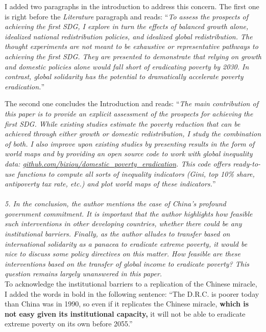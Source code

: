 \documentclass[12pt,english]{article}
\begin{document}
I added two paragraphs in the introduction to address this concern. The first one is right before the \textit{Literature} paragraph and reads: ``\textit{To assess the prospects of achieving the first SDG, I explore in turn the effects of balanced growth alone, idealized national redistribution policies, and idealized global redistribution. The thought experiments are not meant to be exhaustive or representative pathways to achieving the first SDG. They are presented to demonstrate that relying on growth and domestic policies alone would fall short of eradicating poverty by 2030. In contrast, global solidarity has the potential to dramatically accelerate poverty eradication.}''

The second one concludes the Introduction and reads: ``\textit{The main contribution of this paper is to provide an explicit assessment of the prospects for achieving the first SDG. While existing studies estimate the poverty reduction that can be achieved through either growth or domestic redistribution, I study the combination of both. I also improve upon existing studies by presenting results in the form of world maps and by providing an open source code to work with global inequality data: \href{https://github.com/bixiou/domestic_poverty_eradication}{github.com/bixiou/domestic\_poverty\_eradication}. This code offers ready-to-use functions to compute all sorts of inequality indicators (Gini, top 10\% share, antipoverty tax rate, etc.) and plot world maps of these indicators.}''
~\\ ~\\

\textit{5. In the conclusion, the author mentions the case of China's profound government commitment. It is important that the author highlights how feasible such interventions in other developing countries, whether there could be any institutional barriers. Finally, as the author alludes to transfer based on international solidarity as a panacea to eradicate extreme poverty, it would be nice to discuss some policy directives on this matter. How feasible are these interventions based on the transfer of global income to eradicate poverty? This question remains largely unanswered in this paper.}~\\

To acknowledge the institutional barriers to a replication of the Chinese miracle, I added the words in bold in the following sentence: ``The D.R.C. is poorer today than China was in 1990, 
so even if it replicates the Chinese miracle, \textbf{which is not easy given its institutional capacity,} it will not be able to eradicate extreme poverty on its own before 2055.''
~\\ ~\\

\clearpage 
\renewcommand{\url}[1]{\href{#1}{Link}} 
%  
% 
\end{document}

